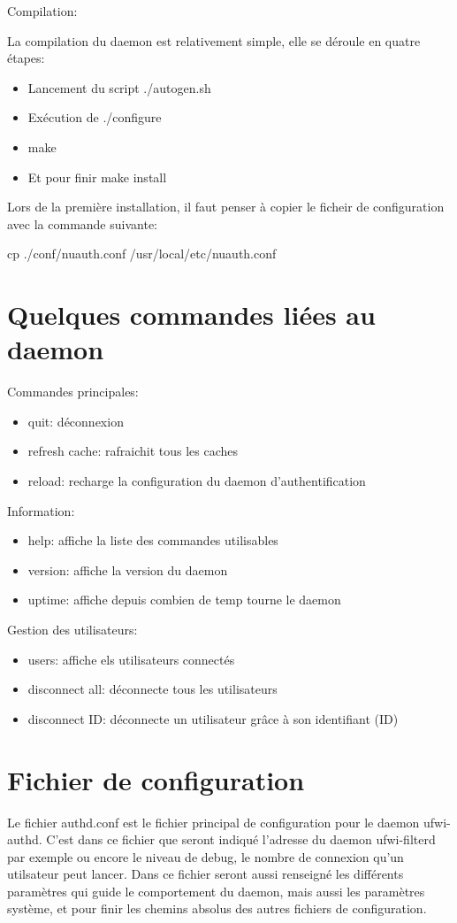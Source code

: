 \documentclass[12pt]{report}
\begin{document}
Compilation:

La compilation du daemon est relativement simple, elle se déroule en quatre étapes:
  \begin{itemize}
   \item Lancement du script ./autogen.sh
   \item Exécution de ./configure
   \item make
   \item Et pour finir make install
  \end{itemize}
Lors de la première installation, il faut penser à copier le ficheir de configuration avec la commande suivante:

cp ./conf/nuauth.conf /usr/local/etc/nuauth.conf

\section{Quelques commandes liées au daemon}

Commandes principales:
\begin{itemize}
  \item quit: déconnexion
  \item refresh cache: rafraichit tous les caches
  \item reload: recharge la configuration du daemon d'authentification 
\end{itemize}
Information:
\begin{itemize}
  \item help: affiche la liste des commandes utilisables
  \item version: affiche la version du daemon
  \item uptime: affiche depuis combien de temp tourne le daemon 
\end{itemize}
Gestion des utilisateurs:
\begin{itemize}
  \item users: affiche els utilisateurs connectés
  \item disconnect all: déconnecte tous les utilisateurs
  \item disconnect ID: déconnecte un utilisateur grâce à son identifiant (ID) 
\end{itemize}

\section{Fichier de configuration}

Le fichier authd.conf est le fichier principal de configuration pour le
daemon ufwi-authd. C'est dans ce fichier que seront indiqué l'adresse du daemon ufwi-filterd 
par exemple ou encore le niveau de debug, le nombre de connexion qu'un utilsateur peut lancer.
Dans ce fichier seront aussi renseigné les différents paramètres qui guide le comportement du 
daemon, mais aussi les paramètres système, et pour finir les chemins absolus des autres fichiers
de configuration.
\end{document}

